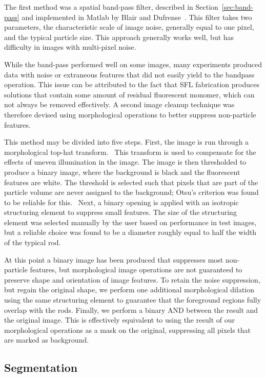 The first method was a spatial band-pass filter, described in 
Section~\ref{sec:band-pass} and implemented in Matlab by Blair and
Dufrense~\cite{blair-dufrense-matlab}. This filter takes two parameters, the characteristic scale
of image noise, generally equal to one pixel, and the typical particle size.  This 
approach generally works well,
but has difficulty in images with multi-pixel noise.

While the band-pass performed well on some images, many experiments produced data with noise or
extraneous features that did
not easily yield to the bandpass operation. This issue can be attributed to the fact that SFL fabrication produces
solutions that contain some amount of residual fluorescent monomer, which
can not always be removed effectively.  A second image cleanup technique was therefore 
devised using morphological
operations to better suppress non-particle features.

This method may be divided into five steps. First, the 
image is run through a morphological top-hat transform.~\cite{soille-book}
This transform is used to compensate for the effects of
uneven illumination in the image. The image is then thresholded to produce a binary image, where the 
background is black and the fluorescent features are white. The threshold is selected such that pixels that 
are part of the particle volume are never assigned to the background; Otsu's criterion was found to be reliable
for this.~\cite{otsu-threshold}  Next, a binary opening is applied with an isotropic structuring element to
suppress small features. The size of the structuring element was selected manually by the user
based on performance in test images, but a 
reliable choice was found to be a diameter roughly equal to half the width of the typical rod. 

At this point a binary image has been produced that suppresses most non-particle features, but morphological
image operations are not guaranteed to preserve shape and orientation of image features.  To retain the noise suppression,
but regain the original shape, we perform one additional morphological dilation using the same structuring element to
guarantee that the foreground regions fully overlap with the rods. Finally, we perform a binary AND between the result and the
original image. This is effectively equivalent to using the result of our morphological operations as a mask on
the original, suppressing
all pixels that are marked as background.

\subsection{Segmentation}

